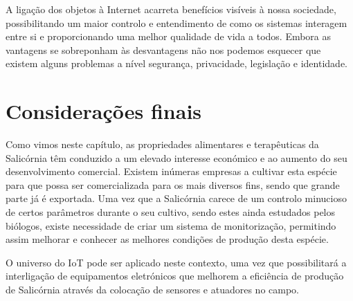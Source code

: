 A ligação dos objetos à Internet acarreta benefícios visíveis à nossa sociedade, possibilitando um maior controlo e entendimento de como os sistemas interagem entre si e proporcionando uma melhor qualidade de vida a todos. Embora as vantagens se sobreponham às desvantagens não nos podemos esquecer que existem alguns problemas a nível segurança, privacidade, legislação e identidade.



\section{Considerações finais}


Como vimos neste capítulo, as propriedades alimentares e terapêuticas da Salicórnia têm conduzido a um elevado interesse económico e ao aumento do seu desenvolvimento comercial. Existem inúmeras empresas a cultivar esta espécie para que possa ser comercializada para os mais diversos fins, sendo que grande parte já é exportada. Uma vez que a Salicórnia carece de um controlo minucioso de certos parâmetros durante o seu cultivo, sendo estes ainda estudados pelos biólogos, existe necessidade de criar um sistema de monitorização, permitindo assim melhorar e conhecer as melhores condições de produção desta espécie. 

O universo do \ac{IoT} pode ser aplicado neste contexto, uma vez que possibilitará a interligação de equipamentos eletrónicos que melhorem a eficiência de produção de Salicórnia através da colocação de sensores e atuadores no campo.  





